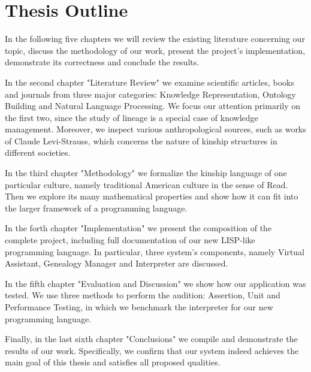 \section{Thesis Outline}
    In the following five chapters we will review the existing literature concerning our topic, discuss the methodology of our work,
    present the project's implementation, demonstrate its correctness and conclude the results.

    In the second chapter "Literature Review" we examine scientific articles, books and journals from three major categories:
    Knowledge Representation, Ontology Building and Natural Language Processing. We focus our attention primarily on the first two,
    since the study of lineage is a special case of knowledge management. Moreover, we inspect various anthropological sources, such
    as works of Claude Levi-Strauss\cite{strauss}, which concerns the nature of kinship structures in different societies.

    In the third chapter "Methodology" we formalize the kinship language of one particular culture, namely traditional American
    culture in the sense of Read\cite{read}. Then we explore its many mathematical properties and show how it can fit into the larger
    framework of a programming language.

    In the forth chapter "Implementation" we present the composition of the complete project, including full documentation of our new
    LISP-like programming language. In particular, three system's components, namely Virtual Assistant, Genealogy Manager and
    Interpreter are discussed.

    In the fifth chapter "Evaluation and Discussion" we show how our application was tested. We use three methods to perform the
    audition: Assertion, Unit and Performance Testing, in which we benchmark the interpreter for our new programming language.

    Finally, in the last sixth chapter "Conclusions" we compile and demonstrate the results of our work. Specifically, we confirm that
    our system indeed achieves the main goal of this thesis and satisfies all proposed qualities.
